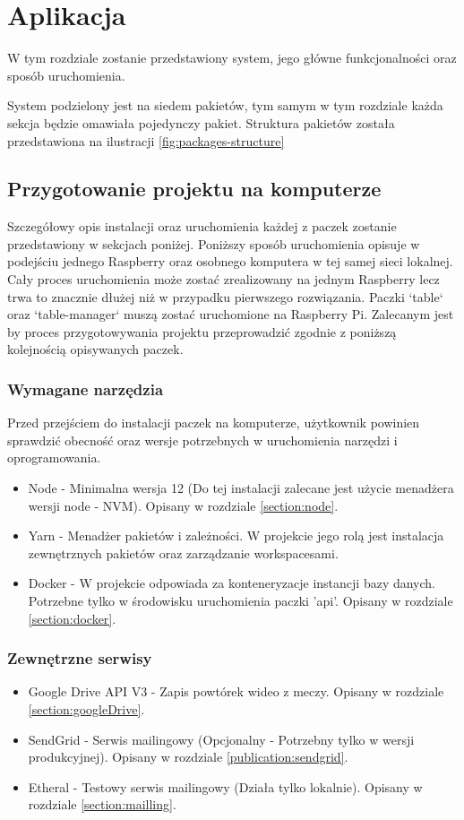 \chapter{Aplikacja}
\label{ch:application}
W tym rozdziale zostanie przedstawiony system, jego główne funkcjonalności oraz sposób uruchomienia.

System podzielony jest na siedem pakietów, tym samym w tym rozdziale każda sekcja będzie omawiała pojedynczy pakiet. Struktura pakietów została przedstawiona na ilustracji \ref{fig:packages-structure}

\section{Przygotowanie projektu na komputerze}
Szczegółowy opis instalacji oraz uruchomienia każdej z paczek zostanie przedstawiony w sekcjach poniżej.
Poniższy sposób uruchomienia opisuje w podejściu jednego Raspberry oraz osobnego komputera w tej samej sieci lokalnej. Cały proces uruchomienia może zostać zrealizowany na jednym Raspberry lecz trwa to znacznie dłużej niż w przypadku pierwszego rozwiązania. Paczki `table` oraz `table-manager` muszą zostać uruchomione na Raspberry Pi. Zalecanym jest by proces przygotowywania projektu przeprowadzić zgodnie z poniższą kolejnością opisywanych paczek.

\subsection{Wymagane narzędzia}
Przed przejściem do instalacji paczek na komputerze, użytkownik powinien sprawdzić obecność oraz wersje potrzebnych w uruchomienia narzędzi i oprogramowania.

\begin{itemize}
	\item Node - Minimalna wersja 12 (Do tej instalacji zalecane jest użycie menadżera wersji node - NVM). Opisany w rozdziale \ref{section:node}.
	\item Yarn - Menadżer pakietów i zależności. W projekcie jego rolą jest instalacja zewnętrznych pakietów oraz zarządzanie workspacesami.
	\item Docker - W projekcie odpowiada za konteneryzacje instancji bazy danych. Potrzebne tylko w środowisku uruchomienia paczki 'api'. Opisany w rozdziale \ref{section:docker}.
\end{itemize}

\label{subsection:externalServices}
\subsection{Zewnętrzne serwisy}
\begin{itemize}
	\item Google Drive API V3 - Zapis powtórek wideo z meczy. Opisany w rozdziale \ref{section:googleDrive}.
	\item SendGrid - Serwis mailingowy (Opcjonalny - Potrzebny tylko w wersji produkcyjnej). Opisany w rozdziale \ref{publication:sendgrid}.
	\item Etheral - Testowy serwis mailingowy (Działa tylko lokalnie). Opisany w rozdziale \ref{section:mailling}.
\end{itemize}

